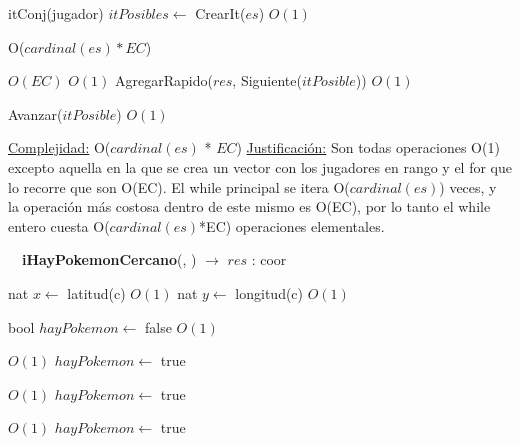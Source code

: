 \begin{Algoritmos}
\begin{algorithm}[H]
\begin{algorithmic}[1]
\State itConj(jugador) $itPosibles \gets$ CrearIt($es$) \Comment $O(1)$

   \Comment O($cardinal(es)*EC$)

     \Comment $O(EC)$
           \Comment $O(1)$
            \State AgregarRapido($res$, Siguiente($itPosible$))  \Comment $O(1)$    
        \EndIf
    \EndFor
    
    \State Avanzar($itPosible$)   \Comment $O(1)$
\EndWhile


\medskip
\State \underline{Complejidad:}  O($cardinal(es)$ * $EC$)
\State \underline{Justificaci\'on:}  Son todas operaciones O(1) excepto aquella en la que se crea un vector con los jugadores en rango y el for que lo recorre que son O(EC). El while principal se itera O($cardinal(es)$) veces, y la operaci\'on m\'as costosa dentro de este mismo es O(EC), por lo tanto el while entero cuesta O($cardinal(es)$*EC) operaciones elementales.

\end{algorithmic}
\end{algorithm}



$ $\newline
$ $\newline
$ $\newline
{\textbf{iHayPokemonCercano}(, ) $\to$ $res$ : coor}
\begin{algorithmic}[1]

\State nat $x \gets$ latitud(c)    \Comment $O(1)$
\State nat $y \gets$ longitud(c)   \Comment $O(1)$


\State bool $hayPokemon \gets$ false    \Comment $O(1)$

     \Comment $O(1)$
    \State $hayPokemon \gets$ true
\EndIf

         \Comment $O(1)$
        \State $hayPokemon \gets$ true
    \EndIf


             \Comment $O(1)$
            \State $hayPokemon \gets$ true
        \EndIf

    \EndIf


\end{algorithmic}
\end{Algoritmos}
